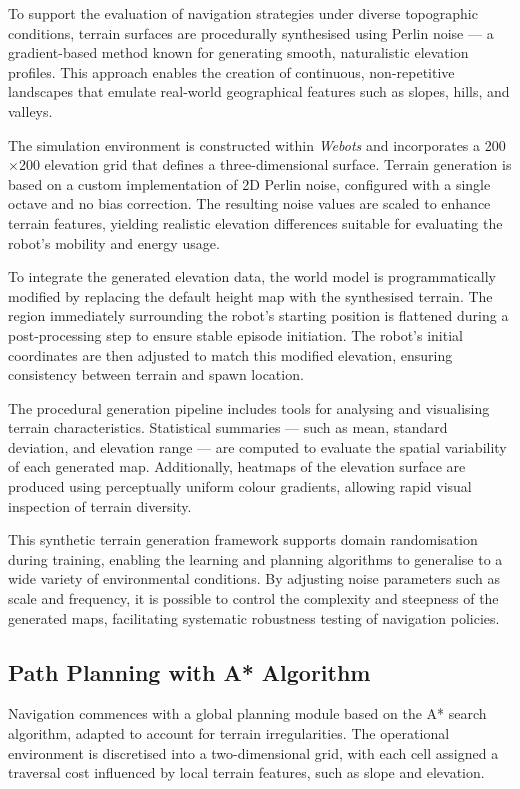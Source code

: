 \documentclass[11pt,twocolumn]{article}
\begin{document}
To support the evaluation of navigation strategies under diverse topographic conditions, terrain surfaces are procedurally synthesised using Perlin noise — a gradient-based method known for generating smooth, naturalistic elevation profiles. This approach enables the creation of continuous, non-repetitive landscapes that emulate real-world geographical features such as slopes, hills, and valleys.

The simulation environment is constructed within \textit{Webots} and incorporates a 200\(\times\)200 elevation grid that defines a three-dimensional surface. Terrain generation is based on a custom implementation of 2D Perlin noise, configured with a single octave and no bias correction. The resulting noise values are scaled to enhance terrain features, yielding realistic elevation differences suitable for evaluating the robot's mobility and energy usage.

To integrate the generated elevation data, the world model is programmatically modified by replacing the default height map with the synthesised terrain. The region immediately surrounding the robot's starting position is flattened during a post-processing step to ensure stable episode initiation. The robot's initial coordinates are then adjusted to match this modified elevation, ensuring consistency between terrain and spawn location.

The procedural generation pipeline includes tools for analysing and visualising terrain characteristics. Statistical summaries — such as mean, standard deviation, and elevation range — are computed to evaluate the spatial variability of each generated map. Additionally, heatmaps of the elevation surface are produced using perceptually uniform colour gradients, allowing rapid visual inspection of terrain diversity.

This synthetic terrain generation framework supports domain randomisation during training, enabling the learning and planning algorithms to generalise to a wide variety of environmental conditions. By adjusting noise parameters such as scale and frequency, it is possible to control the complexity and steepness of the generated maps, facilitating systematic robustness testing of navigation policies.

\subsection{Path Planning with A* Algorithm}

Navigation commences with a global planning module based on the A* search algorithm, adapted to account for terrain irregularities. The operational environment is discretised into a two-dimensional grid, with each cell assigned a traversal cost influenced by local terrain features, such as slope and elevation.
\end{document}
